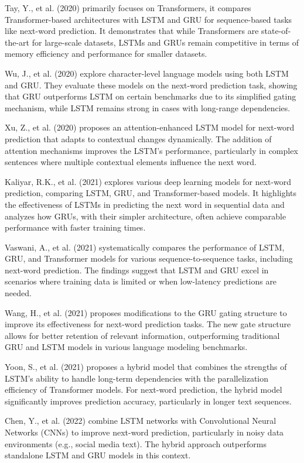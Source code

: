 \documentclass[conference]{IEEEtran}
\begin{document}
Tay, Y., et al. (2020) primarily focuses on Transformers, it compares Transformer-based architectures with LSTM and GRU for sequence-based tasks like next-word prediction. It demonstrates that while Transformers are state-of-the-art for large-scale datasets, LSTMs and GRUs remain competitive in terms of memory efficiency and performance for smaller datasets.

Wu, J., et al. (2020) explore character-level language models using both LSTM and GRU. They evaluate these models on the next-word prediction task, showing that GRU outperforms LSTM on certain benchmarks due to its simplified gating mechanism, while LSTM remains strong in cases with long-range dependencies.

Xu, Z., et al. (2020) proposes an attention-enhanced LSTM model for next-word prediction that adapts to contextual changes dynamically. The addition of attention mechanisms improves the LSTM's performance, particularly in complex sentences where multiple contextual elements influence the next word.

Kaliyar, R.K., et al. (2021) explores various deep learning models for next-word prediction, comparing LSTM, GRU, and Transformer-based models. It highlights the effectiveness of LSTMs in predicting the next word in sequential data and analyzes how GRUs, with their simpler architecture, often achieve comparable performance with faster training times.

Vaswani, A., et al. (2021) systematically compares the performance of LSTM, GRU, and Transformer models for various sequence-to-sequence tasks, including next-word prediction. The findings suggest that LSTM and GRU excel in scenarios where training data is limited or when low-latency predictions are needed.

Wang, H., et al. (2021) proposes modifications to the GRU gating structure to improve its effectiveness for next-word prediction tasks. The new gate structure allows for better retention of relevant information, outperforming traditional GRU and LSTM models in various language modeling benchmarks.

Yoon, S., et al. (2021) proposes a hybrid model that combines the strengths of LSTM's ability to handle long-term dependencies with the parallelization efficiency of Transformer models. For next-word prediction, the hybrid model significantly improves prediction accuracy, particularly in longer text sequences.

Chen, Y., et al. (2022) combine LSTM networks with Convolutional Neural Networks (CNNs) to improve next-word prediction, particularly in noisy data environments (e.g., social media text). The hybrid approach outperforms standalone LSTM and GRU models in this context.
\end{document}
